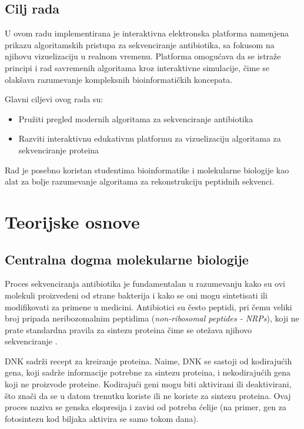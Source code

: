 \documentclass[12pt,oneside]{memoir}
\begin{document}
\section{Cilj rada}
U ovom radu implementirana je interaktivna elektronska platforma namenjena prikazu algoritamskih pristupa za sekvenciranje antibiotika, sa fokusom na njihovu vizuelizaciju u realnom vremenu. Platforma omogućava da se istraže principi i rad savremenih algoritama kroz interaktivne simulacije, čime se olakšava razumevanje kompleksnih bioinformatičkih koncepata.

Glavni ciljevi ovog rada su:
\begin{itemize}
    \item Pružiti pregled modernih algoritama za sekvenciranje antibiotika
    \item Razviti interaktivnu edukativnu platformu za vizuelizaciju algoritama za sekvenciranje proteina
\end{itemize}

Rad je posebno koristan studentima bioinformatike i molekularne biologije kao alat za bolje razumevanje algoritama za rekonstrukciju peptidnih sekvenci.

\chapter{Teorijske osnove}

\section{Centralna dogma molekularne biologije}
Proces sekvenciranja antibiotika je fundamentalan u razumevanju kako su ovi molekuli proizvedeni od strane bakterija i kako se oni mogu sintetisati ili modifikovati za primene u medicini. Antibiotici su često peptidi, pri čemu veliki broj pripada neribozomalnim peptidima (\emph{non-ribosomal peptides - NRPs}), koji ne prate standardna pravila za sintezu proteina čime se otežava njihovo sekvenciranje \cite{online_lecture, online_book}.

DNK sadrži recept za kreiranje proteina. Naime, DNK se sastoji od kodirajućih gena, koji sadrže informacije potrebne za sintezu proteina, i nekodirajućih gena koji ne proizvode proteine. Kodirajući geni mogu biti aktivirani ili deaktivirani, što znači da se u datom trenutku koriste ili ne koriste za sintezu proteina. Ovaj proces naziva se genska ekspresija i zavisi od potreba ćelije (na primer, gen za fotosintezu kod biljaka aktivira se samo tokom dana).
\end{document}
